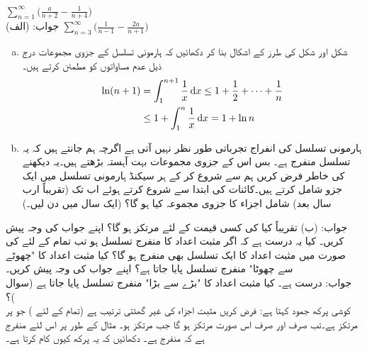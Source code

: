 $\sum\limits_{n=1}^{\infty}\big(\frac{a}{n+2}-\frac{1}{n+4}\big)$\\
جواب:\quad
(الف) 
$\sum\limits_{n=3}^{\infty}\big(\frac{1}{n-1}-\frac{2a}{n+1}\big)$
\begin{enumerate}[a.]
\item
شکل  اور شکل  کی طرز کے اشکال بنا کر دکھائیں کہ ہارمونی تسلسل کے جزوی مجموعات درج ذیل عدم مساواتوں کو مطمئن کرتے ہیں۔ 
\begin{align*}
\ln(n+1)&=\int_1^{n+1}\frac{1}{x}\dif x\le 1+\frac{1}{2}+\cdots+\frac{1}{n}\\
&\le 1+\int_1^n\frac{1}{x}\dif x=1+\ln n
\end{align*}
%
\item
ہارمونی تسلسل کی انفراج  تجرباتی طور نظر نہیں آتی ہے اگرچہ ہم جانتے ہیں کہ یہ تسلسل منفرج ہے۔ بس اس کے جزوی مجموعات بہت آہستہ بڑھتے ہیں۔یہ دیکھنے کی خاطر فرض کریں ہم  سے شروع کر کے ہر سیکنڈ ہارمونی تسلسل میں ایک جزو شامل کرتے ہیں۔کائنات کی ابتدا سے شروع کرتے ہوئے اب تک (تقریباً  ارب سال بعد) شامل اجزاء کا جزوی مجموعہ کیا ہو گا؟ (ایک سال میں  دن لیں۔)
\end{enumerate}
جواب:\quad
(ب) تقریباً 
کیا  کی کسی قیمت کے لئے  مرتکز ہو گا؟ اپنے جواب کی وجہ پیش کریں۔
کیا یہ درست ہے کہ اگر  مثبت اعداد کا منفرج تسلسل ہو تب تمام  کے لئے  کی صورت میں مثبت اعداد کا ایک تسلسل  بھی منفرج ہو گا؟ کیا مثبت اعداد کا  "چھوٹے سے چھوٹا" منفرج تسلسل پایا جاتا ہے؟ اپنے جواب کی وجہ پیش کریں۔\\
جواب:\quad
درست ہے۔
کیا مثبت اعداد کا "بڑے سے بڑا" منفرج تسلسل پایا جاتا ہے (سوال )؟
\\
کوشی پرکھ جمود کہتا ہے: فرض کریں  مثبت اجزاء کی غیر گھٹتی ترتیب ہے  (تمام  کے لئے )  جو  پر مرتکز ہے۔تب  صرف اور صرف اس صورت مرتکز ہو گا جب  مرتکز ہو۔ مثال کے طور پر   اس لئے منفرج  ہے کہ  منفرج ہے۔ دکھائیں کہ یہ پرکھ کیوں کام کرتا ہے۔
